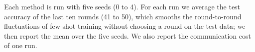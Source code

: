 \documentclass[runningheads]{llncs}
\begin{document}
Each method is run with five seeds (0 to 4). For each run we average the
test accuracy of the last ten rounds (41 to 50), which smooths the round-to-round fluctuations of
few-shot training without choosing a round on the test data; we then report the mean over the five
seeds. We also report the communication cost of one run.
\end{document}
